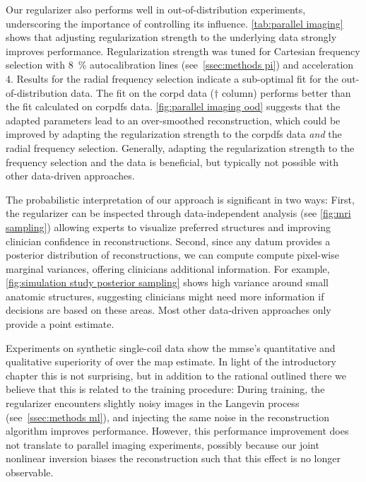 Our regularizer also performs well in out-of-distribution experiments, underscoring the importance of controlling its influence.
\cref{tab:parallel imaging} shows that adjusting regularization strength to the underlying data strongly improves performance.
Regularization strength was tuned for Cartesian frequency selection with \qty{8}{\percent} autocalibration lines (see~\cref{ssec:methods pi}) and acceleration \num{4}.
Results for the radial frequency selection indicate a sub-optimal fit for the out-of-distribution data.
The fit on the \gls{corpd} data (\( \dagger \) column) performs better than the fit calculated on \gls{corpdfs} data.
\cref{fig:parallel imaging ood} suggests that the adapted parameters lead to an over-smoothed reconstruction, which could be improved by adapting the regularization strength to the \gls{corpdfs} data \emph{and} the radial frequency selection.
Generally, adapting the regularization strength to the frequency selection and the data is beneficial, but typically not possible with other data-driven approaches.

The probabilistic interpretation of our approach is significant in two ways:
First, the regularizer can be inspected through data-independent analysis (see \cref{fig:mri sampling}) allowing experts to visualize preferred structures and improving clinician confidence in reconstructions.
Second, since any datum provides a posterior distribution of reconstructions, we can compute compute pixel-wise marginal variances, offering clinicians additional information.
For example, \cref{fig:simulation study posterior sampling} shows high variance around small anatomic structures, suggesting clinicians might need more information if decisions are based on these areas.
Most other data-driven approaches only provide a point estimate.

Experiments on synthetic single-coil data show the \gls{mmse}'s quantitative and qualitative superiority of over the \gls{map} estimate.
In light of the introductory chapter this is not surprising, but in addition to the rational outlined there we believe that this is related to the training procedure:
During training, the regularizer encounters slightly noisy images in the Langevin process (see~\cref{ssec:methods ml}), and injecting the same noise in the reconstruction algorithm improves performance.
However, this performance improvement does not translate to parallel imaging experiments, possibly because our joint nonlinear inversion biases the reconstruction such that this effect is no longer observable.

